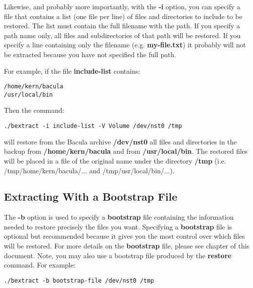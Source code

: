 Likewise, and probably more importantly, with the {\bf -i} option, you can
specify a file that contains a list (one file per line) of files and
directories to include to be restored. The list must contain the full filename
with the path. If you specify a path name only, all files and subdirectories
of that path will be restored. If you specify a line containing only the
filename (e.g. {\bf my-file.txt}) it probably will not be extracted because
you have not specified the full path.

For example, if the file {\bf include-list} contains:

\footnotesize
\begin{verbatim}
/home/kern/bacula
/usr/local/bin
\end{verbatim}
\normalsize

Then the command:

\footnotesize
\begin{verbatim}
./bextract -i include-list -V Volume /dev/nst0 /tmp
\end{verbatim}
\normalsize

will restore from the Bacula archive {\bf /dev/nst0} all files and directories
in the backup from {\bf /home/kern/bacula} and from {\bf /usr/local/bin}. The
restored files will be placed in a file of the original name under the
directory {\bf /tmp} (i.e. /tmp/home/kern/bacula/... and
/tmp/usr/local/bin/...).

\subsection{Extracting With a Bootstrap File}

The {\bf -b} option is used to specify a {\bf bootstrap} file containing the
information needed to restore precisely the files you want. Specifying a {\bf
bootstrap} file is optional but recommended because it gives you the most
control over which files will be restored. For more details on the {\bf
bootstrap} file, please see
chapter of this document. Note, you may also use a bootstrap file produced by
the {\bf restore} command. For example:

\footnotesize
\begin{verbatim}
./bextract -b bootstrap-file /dev/nst0 /tmp
\end{verbatim}
\normalsize

